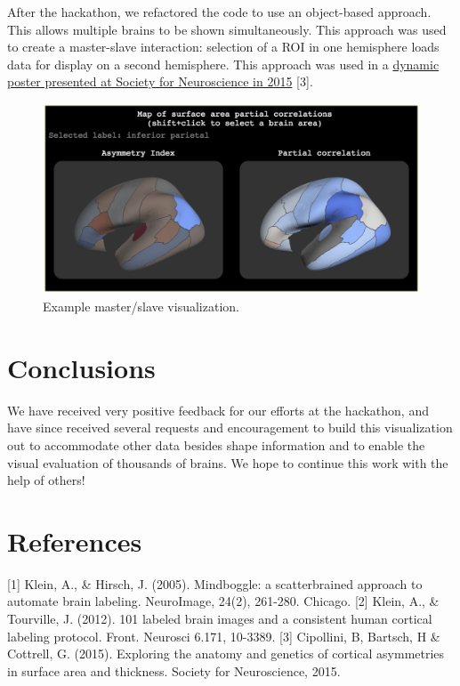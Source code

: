 \documentclass[twocolumn]{bmcart}%
\begin{document}
After the hackathon, we refactored the code to use an object-based
approach. This allows multiple brains to be shown simultaneously. This
approach was used to create a master-slave interaction: selection of a
ROI in one hemisphere loads data for display on a second hemisphere.
This approach was used in a
\href{http://cseweb.ucsd.edu/~bcipolli/docs/posters/SfN2015/}{dynamic
poster presented at Society for Neuroscience in 2015} {[}3{]}.

\begin{figure}[h!] \includegraphics[width=.42\textwidth]{roygbiv-master-slave.png} \caption{\label{centfig} Example master/slave visualization.} \end{figure}

\section{Conclusions}\label{conclusions}

We have received very positive feedback for our efforts at the
hackathon, and have since received several requests and encouragement to
build this visualization out to accommodate other data besides shape
information and to enable the visual evaluation of thousands of brains.
We hope to continue this work with the help of others!

\section{References}\label{references}

{[}1{]} Klein, A., \& Hirsch, J. (2005). Mindboggle: a scatterbrained
approach to automate brain labeling. NeuroImage, 24(2), 261-280.
Chicago. {[}2{]} Klein, A., \& Tourville, J. (2012). 101 labeled brain
images and a consistent human cortical labeling protocol. Front.
Neurosci 6.171, 10-3389. {[}3{]} Cipollini, B, Bartsch, H \& Cottrell,
G. (2015). Exploring the anatomy and genetics of cortical asymmetries in
surface area and thickness. Society for Neuroscience, 2015.

\end{document}
